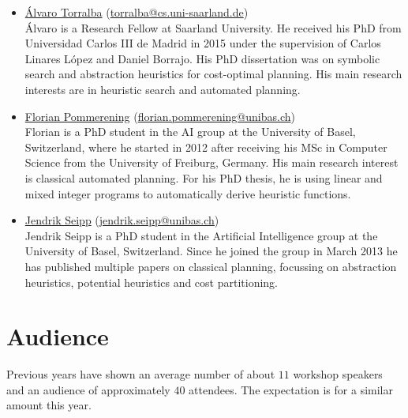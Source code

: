 \documentclass[10pt]{article}
\begin{document}
\begin{itemize}
\item \href{https://fai.cs.uni-saarland.de/torralba/}{\'{A}lvaro
  Torralba}
  (\href{mailto:torralba@cs.uni-saarland.de}{torralba@cs.uni-saarland.de})\\ \'{A}lvaro
  is a Research Fellow at Saarland University. He received his PhD
  from Universidad Carlos III de Madrid in 2015 under the supervision
  of Carlos Linares L\'{o}pez and Daniel Borrajo. His PhD dissertation
  was on symbolic search and abstraction heuristics for cost-optimal
  planning. His main research interests are in heuristic search and
  automated planning.

\item \href{http://ai.cs.unibas.ch/people/pommeren}{Florian Pommerening}
  (\href{mailto:florian.pommerening@unibas.ch}{florian.pommerening@unibas.ch})\\
  Florian is a PhD student in the AI group at the University of Basel,
  Switzerland, where he started in 2012 after receiving his MSc in
  Computer Science from the University of Freiburg, Germany. His main
  research interest is classical automated planning. For his PhD
  thesis, he is using linear and mixed integer programs to
  automatically derive heuristic functions.

\item \href{http://ai.cs.unibas.ch/people/seipp}{Jendrik Seipp}
  (\href{mailto:jendrik.seipp@unibas.ch}{jendrik.seipp@unibas.ch})\\
  Jendrik Seipp is a PhD student in the Artificial Intelligence group
  at the University of Basel, Switzerland. Since he joined the group in
  March 2013 he has published multiple papers on classical planning,
  focussing on abstraction heuristics, potential heuristics and cost
  partitioning.

\end{itemize}


\section*{Audience}
Previous years have shown an average number of about $11$ workshop
speakers and an audience of approximately $40$ attendees. The
expectation is for a similar amount this year.
\end{document}
